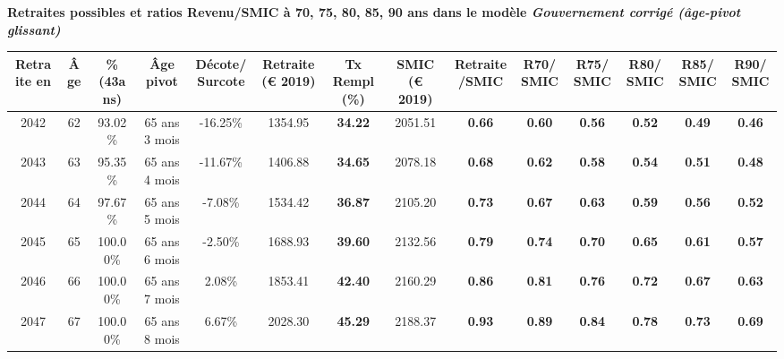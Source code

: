  \vspace{0.1cm} 
{\bf \noindent Retraites possibles et ratios Revenu/SMIC à 70, 75, 80, 85, 90 ans dans le modèle \emph{Gouvernement corrigé (âge-pivot glissant)}}  
 
\begin{adjustbox}{max width=\textwidth} 
\begin{tabular}[htb]{|c|c||c|c|c||c|c||c|c||c|c|c|c|c|} 
\hline 
 Retraite en &  Âge &  \%(43ans) &  Âge pivot &  Décote/Surcote &  Retraite (\euro{} 2019) &  Tx Rempl(\%) &  SMIC (\euro{} 2019) &  Retraite/SMIC &  R70/SMIC &  R75/SMIC &  R80/SMIC &  R85/SMIC &  R90/SMIC \\ 
\hline \hline 
 2042 &  62 &  93.02\% &  65 ans 3 mois &  -16.25\% &  1354.95 &  {\bf 34.22} &  2051.51 &  {\bf {\color{red} 0.66}} &  {\bf {\color{red} 0.60}} &  {\bf {\color{red} 0.56}} &  {\bf {\color{red} 0.52}} &  {\bf {\color{red} 0.49}} &  {\bf {\color{red} 0.46}} \\ 
\hline 
 2043 &  63 &  95.35\% &  65 ans 4 mois &  -11.67\% &  1406.88 &  {\bf 34.65} &  2078.18 &  {\bf {\color{red} 0.68}} &  {\bf {\color{red} 0.62}} &  {\bf {\color{red} 0.58}} &  {\bf {\color{red} 0.54}} &  {\bf {\color{red} 0.51}} &  {\bf {\color{red} 0.48}} \\ 
\hline 
 2044 &  64 &  97.67\% &  65 ans 5 mois &  -7.08\% &  1534.42 &  {\bf 36.87} &  2105.20 &  {\bf {\color{red} 0.73}} &  {\bf {\color{red} 0.67}} &  {\bf {\color{red} 0.63}} &  {\bf {\color{red} 0.59}} &  {\bf {\color{red} 0.56}} &  {\bf {\color{red} 0.52}} \\ 
\hline 
 2045 &  65 &  100.00\% &  65 ans 6 mois &  -2.50\% &  1688.93 &  {\bf 39.60} &  2132.56 &  {\bf {\color{red} 0.79}} &  {\bf {\color{red} 0.74}} &  {\bf {\color{red} 0.70}} &  {\bf {\color{red} 0.65}} &  {\bf {\color{red} 0.61}} &  {\bf {\color{red} 0.57}} \\ 
\hline 
 2046 &  66 &  100.00\% &  65 ans 7 mois &  2.08\% &  1853.41 &  {\bf 42.40} &  2160.29 &  {\bf {\color{red} 0.86}} &  {\bf {\color{red} 0.81}} &  {\bf {\color{red} 0.76}} &  {\bf {\color{red} 0.72}} &  {\bf {\color{red} 0.67}} &  {\bf {\color{red} 0.63}} \\ 
\hline 
 2047 &  67 &  100.00\% &  65 ans 8 mois &  6.67\% &  2028.30 &  {\bf 45.29} &  2188.37 &  {\bf {\color{red} 0.93}} &  {\bf {\color{red} 0.89}} &  {\bf {\color{red} 0.84}} &  {\bf {\color{red} 0.78}} &  {\bf {\color{red} 0.73}} &  {\bf {\color{red} 0.69}} \\ 
\hline 
\hline 
\end{tabular} 
\end{adjustbox} 
 
